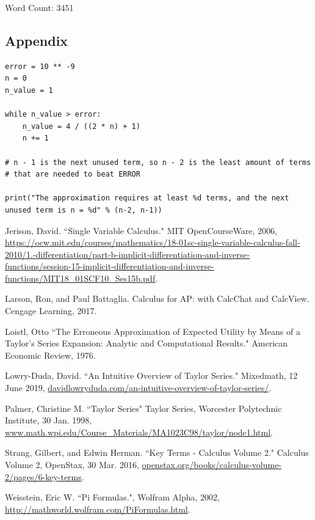 \documentclass[12pt, titlepage]{article}
\begin{document}
Word Count: 3451

\pagebreak
\begin{appendix}
\section{Appendix}
\begin{verbatim}
error = 10 ** -9
n = 0
n_value = 1

while n_value > error:
    n_value = 4 / ((2 * n) + 1)
    n += 1

# n - 1 is the next unused term, so n - 2 is the least amount of terms 
# that are needed to beat ERROR

print("The approximation requires at least %d terms, and the next
unused term is n = %d" % (n-2, n-1))
\end{verbatim}
\end{appendix}

\newpage
\begin{thebibliography}{thewidest}
  Jerison, David. ``Single Variable Calculus." MIT OpenCourseWare, 2006, \url{https://ocw.mit.edu/courses/mathematics/18-01sc-single-variable-calculus-fall-2010/1.-differentiation/part-b-implicit-differentiation-and-inverse-functions/session-15-implicit-differentiation-and-inverse-functions/MIT18_01SCF10_Ses15b.pdf}.

  Larson, Ron, and Paul Battaglia. Calculus for AP: with CalcChat and CalcView. Cengage Learning, 2017.

  Loistl, Otto ``The Erroneous Approximation of Expected Utility by Means of a Taylor's Series Expansion: Analytic and Computational Results." American Economic Review, 1976.

  Lowry-Duda, David. ``An Intuitive Overview of Taylor Series." Mixedmath, 12 June 2019, \url{davidlowryduda.com/an-intuitive-overview-of-taylor-series/}.

  Palmer, Christine M. ``Taylor Series" Taylor Series, Worcester Polytechnic Institute, 30 Jan. 1998, \url{www.math.wpi.edu/Course_Materials/MA1023C98/taylor/node1.html}.

  Strang, Gilbert, and Edwin Herman. ``Key Terms - Calculus Volume 2." Calculus Volume 2, OpenStax, 30 Mar. 2016, \url{openstax.org/books/calculus-volume-2/pages/6-key-terms}.

  Weisstein, Eric W. ``Pi Formulas.", Wolfram Alpha, 2002, \url{http://mathworld.wolfram.com/PiFormulas.html}.
\end{thebibliography}
\end{document}
